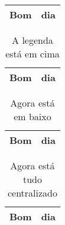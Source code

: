 \documentclass{article}
\begin{document}

\begin{table}
  \begin{tabular}{| c | c |}
    \hline
    Bom & dia\\
    \hline
  \end{tabular}
\end{table}

  \begin{table}
    \caption{A legenda está em cima}
    \begin{tabular}{| c | c |}
      \hline
      Bom & dia \\
      \hline
    \end{tabular}
  \end{table}
  
  \begin{table}
    \begin{tabular}{| c | c |}
      \hline
      Bom & dia \\
      \hline
    \end{tabular}
    \caption{Agora está em baixo}
  \end{table}

  \begin{table}
    \centering
    \begin{tabular}{| c | c |}
      \hline
      Bom & dia \\
      \hline
    \end{tabular}
    \caption{Agora está tudo centralizado}
  \end{table}
\end{document}
